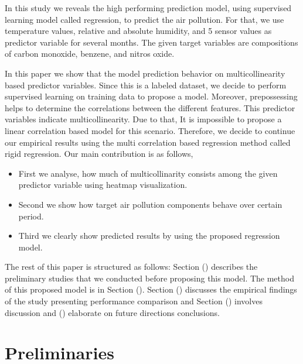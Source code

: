 In this study we reveals the high performing prediction model,
using supervised learning model called regression,
to predict the air pollution.
For that, we use temperature values, relative and absolute humidity, 
and 5 sensor values as predictor variable for several months.
The given target variables are compositions of carbon monoxide, benzene, and nitros oxide.


In this paper we show that the model prediction behavior on multicollinearity based predictor variables. 
Since this is a labeled dataset, we 
decide to perform supervised learning on training data to propose a model.
Moreover, prepossessing helps to determine the 
correlations between the different features.
This predictor variables indicate multicollinearity.
Due to that, It is impossible to propose a linear correlation based model for this scenario. 
Therefore, we decide to continue our empirical 
results using the multi correlation based regression method called rigid regression. 
Our main contribution is as follows,
\begin{itemize}
	\item First we analyse, how much of multicollinarity consists among the given predictor variable using heatmap visualization.
	\item Second we show how target air pollution components behave over certain period.
	\item Third we clearly show predicted results by using the proposed regression model.

\end{itemize}


The rest of this paper is structured as follows:
Section () describes the preliminary studies that we conducted before proposing this model.
The method of this proposed model is in Section ().
Section () discusses the empirical findings of the study presenting performance comparison
and Section () involves discussion and () elaborate on future directions conclusions.

\section{Preliminaries} \label{sec-preliminaries}

